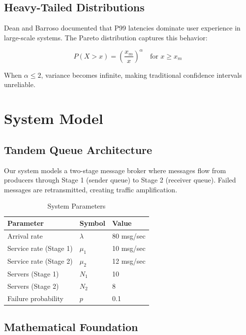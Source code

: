 \documentclass[conference,twocolumn]{IEEEtran}
\begin{document}
\subsection{Heavy-Tailed Distributions}

Dean and Barroso \cite{dean2013} documented that P99 latencies dominate user experience in large-scale systems. The Pareto distribution captures this behavior:

\begin{equation}
P(X > x) = \left(\frac{x_m}{x}\right)^\alpha \quad \text{for } x \geq x_m
\end{equation}

When $\alpha \leq 2$, variance becomes infinite, making traditional confidence intervals unreliable.

\section{System Model}

\subsection{Tandem Queue Architecture}

Our system models a two-stage message broker where messages flow from producers through Stage 1 (sender queue) to Stage 2 (receiver queue). Failed messages are retransmitted, creating traffic amplification.

\begin{table}[h]
\centering
\caption{System Parameters}
\begin{tabular}{lll}
\toprule
\textbf{Parameter} & \textbf{Symbol} & \textbf{Value} \\
\midrule
Arrival rate & $\lambda$ & 80 msg/sec \\
Service rate (Stage 1) & $\mu_1$ & 10 msg/sec \\
Service rate (Stage 2) & $\mu_2$ & 12 msg/sec \\
Servers (Stage 1) & $N_1$ & 10 \\
Servers (Stage 2) & $N_2$ & 8 \\
Failure probability & $p$ & 0.1 \\
\bottomrule
\end{tabular}
\label{tab:params}
\end{table}

\subsection{Mathematical Foundation}
\end{document}
